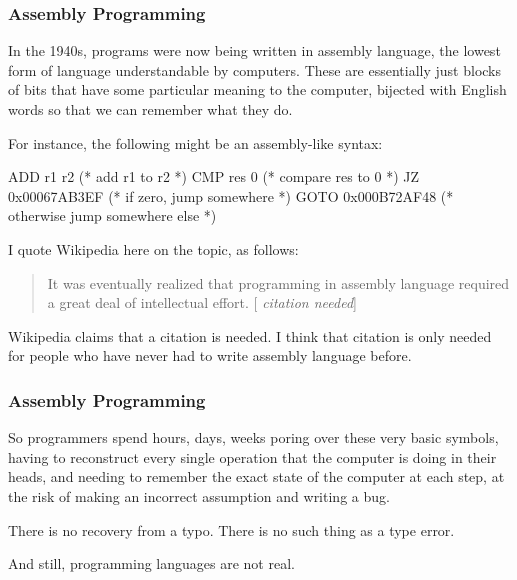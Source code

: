 \documentclass[aspectratio=169, handout]{beamer}
\begin{document}
\begin{frame}[fragile]
  \frametitle{Assembly Programming}

  In the 1940s, programs were now being written in assembly language, the lowest
  form of language understandable by computers. These are essentially just blocks
  of bits that have some particular meaning to the computer, bijected with
  English words so that we can remember what they do.

  \pause
  \vspace{\fill}

  For instance, the following might be an assembly-like syntax:
  \begin{codeblock}
    ADD r1 r2         (* add r1 to r2 *)
    CMP res 0         (* compare res to 0 *)
    JZ   0x00067AB3EF (* if zero, jump somewhere *)
    GOTO 0x000B72AF48 (* otherwise jump somewhere else *)
  \end{codeblock}

  \pause
  \vspace{\fill}

  I quote Wikipedia here on the topic, as follows:
  \pause
  \begin{quote}
    It was eventually realized that programming in assembly language required a
    great deal of intellectual effort. [{\color{blue} \textit{citation needed}}]
  \end{quote}

  \pause
  \vspace{\fill}

  Wikipedia claims that a citation is needed. I think that citation is only needed
  for people who have never had to write assembly language before.
\end{frame}

\begin{frame}[fragile]
  \frametitle{Assembly Programming}

  So programmers spend hours, days, weeks poring over these very basic symbols,
  having to reconstruct every single operation that the computer is doing in their
  heads, and needing to remember the exact state of the computer at each step,
  at the risk of making an incorrect assumption and writing a bug.

  \pause
  \vspace{\fill}

  There is no recovery from a typo. There is no such thing as a type error.

  \pause
  \vspace{\fill}

  And still, programming languages are not real.
\end{frame}
\end{document}
